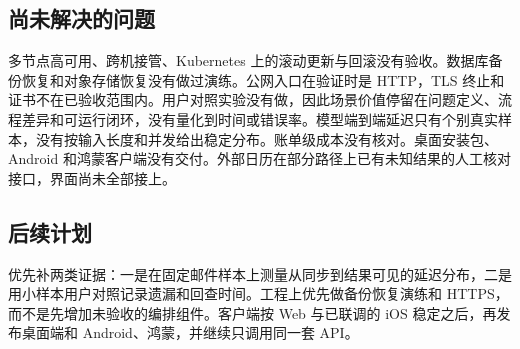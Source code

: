 \documentclass[UTF8,a4paper,zihao=5,fontset=fandol]{ctexart}
\begin{document}
\subsection{尚未解决的问题}
多节点高可用、跨机接管、Kubernetes 上的滚动更新与回滚没有验收。数据库备份恢复和对象存储恢复没有做过演练。公网入口在验证时是 HTTP，TLS 终止和证书不在已验收范围内。用户对照实验没有做，因此场景价值停留在问题定义、流程差异和可运行闭环，没有量化到时间或错误率。模型端到端延迟只有个别真实样本，没有按输入长度和并发给出稳定分布。账单级成本没有核对。桌面安装包、Android 和鸿蒙客户端没有交付。外部日历在部分路径上已有未知结果的人工核对接口，界面尚未全部接上。

\subsection{后续计划}
优先补两类证据：一是在固定邮件样本上测量从同步到结果可见的延迟分布，二是用小样本用户对照记录遗漏和回查时间。工程上优先做备份恢复演练和 HTTPS，而不是先增加未验收的编排组件。客户端按 Web 与已联调的 iOS 稳定之后，再发布桌面端和 Android、鸿蒙，并继续只调用同一套 API。
\end{document}
